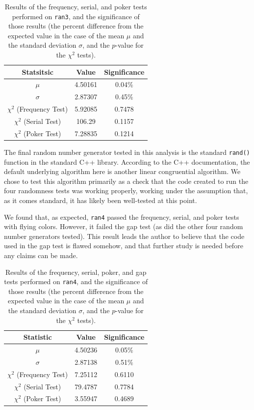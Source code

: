 \documentclass[12pt]{article}
\numberwithin{equation}{section}
\begin{document}
\begin{table}[ht]
\begin{center}
\begin{tabular}{c|c|c} \hline
Statsitsic & Value & Significance\\\hline
$\mu$ & 4.50161 & 0.04\%\\
$\sigma$ & 2.87307 & 0.45\%\\
$\chi^{2}$ (Frequency Test) & 5.92085 & 0.7478\\
$\chi^{2}$ (Serial Test) & 106.29 & 0.1157\\
$\chi^{2}$ (Poker Test) & 7.28835 & 0.1214\\ \hline
\end{tabular}
\caption{Results of the frequency, serial, and poker tests performed on \texttt{ran3}, and the significance of those results (the percent difference from the expected value in the case of the mean $\mu$ and the standard deviation $\sigma$, and the $p$-value for the $\chi^{2}$ tests).}
\label{tab:ran3results}
\end{center}
\end{table}

\par The final random number generator tested in this analysis is the standard \texttt{rand()} function in the standard C++ library.  According to the C++ documentation, the default underlying algorithm here is another linear congruential algorithm.  We chose to test this algorithm primarily as a check that the code created to run the four randomness tests was working properly, working under the assumption that, as it comes standard, it has likely been well-tested at this point.
\par We found that, as expected, \texttt{ran4} passed the frequency, serial, and poker tests with flying colors.  However, it failed the gap test (as did the other four random number generators tested).  This result leads the author to believe that the code used in the gap test is flawed somehow, and that further study is needed before any claims can be made.

\begin{table}[ht]
\begin{center}
\begin{tabular}{c|c|c} \hline
Statistic & Value & Significance\\\hline
$\mu$ & 4.50236 & 0.05\%\\
$\sigma$ & 2.87138 & 0.51\%\\
$\chi^{2}$ (Frequency Test) & 7.25112 & 0.6110 \\
$\chi^{2}$ (Serial Test) & 79.4787 & 0.7784 \\
$\chi^{2}$ (Poker Test) & 3.55947 & 0.4689 \\ \hline
\end{tabular}
\caption{Results of the frequency, serial, poker, and gap tests performed on \texttt{ran4}, and the significance of those results (the percent difference from the expected value in the case of the mean $\mu$ and the standard deviation $\sigma$, and the $p$-value for the $\chi^{2}$ tests).}
\label{tab:ran4results}
\end{center}
\end{table}
\end{document}
